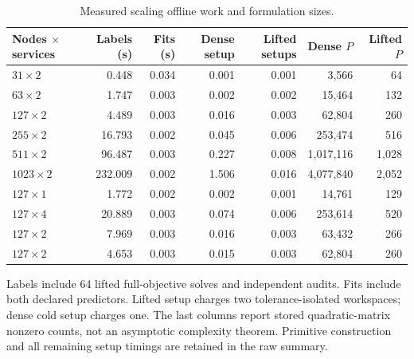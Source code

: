 \begin{table}[tbp]\centering\small
\caption{Measured scaling offline work and formulation sizes.}\label{tab:r22-setup}
\begin{tabular}{lrrrrrr}
\toprule
Nodes $\times$ services & Labels (s) & Fits (s) & Dense setup & Lifted setups & Dense $P$ & Lifted $P$\\
\midrule
$31\times 2$ & 0.448 & 0.034 & 0.001 & 0.001 & 3,566 & 64\\
$63\times 2$ & 1.747 & 0.003 & 0.002 & 0.002 & 15,464 & 132\\
$127\times 2$ & 4.489 & 0.003 & 0.016 & 0.003 & 62,804 & 260\\
$255\times 2$ & 16.793 & 0.002 & 0.045 & 0.006 & 253,474 & 516\\
$511\times 2$ & 96.487 & 0.003 & 0.227 & 0.008 & 1,017,116 & 1,028\\
$1023\times 2$ & 232.009 & 0.002 & 1.506 & 0.016 & 4,077,840 & 2,052\\
$127\times 1$ & 1.772 & 0.002 & 0.002 & 0.001 & 14,761 & 129\\
$127\times 4$ & 20.889 & 0.003 & 0.074 & 0.006 & 253,614 & 520\\
$127\times 2$ & 7.969 & 0.003 & 0.016 & 0.003 & 63,432 & 266\\
$127\times 2$ & 4.653 & 0.003 & 0.015 & 0.003 & 62,804 & 260\\
\bottomrule
\end{tabular}
\par\smallskip\begin{minipage}{.98\textwidth}\small Labels include 64 lifted full-objective solves and independent audits. Fits include both declared predictors. Lifted setup charges two tolerance-isolated workspaces; dense cold setup charges one. The last columns report stored quadratic-matrix nonzero counts, not an asymptotic complexity theorem. Primitive construction and all remaining setup timings are retained in the raw summary.\end{minipage}
\end{table}
